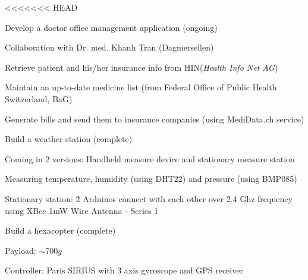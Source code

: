 

\begin{cventries}
<<<<<<< HEAD

\cventry
{} %
{Develop a doctor office management application (ongoing)} %
{} %
{} %
{\vspace{-12pt}
	\begin{cvitems} %
		\item {Collaboration with Dr. med. Khanh Tran (Dagmersellen)}
		\item {Retrieve patient and his/her insurance info from HIN(\textit{Health Info Net AG})}
		\item {Maintain an up-to-date medicine list (from Federal Office of Public Health Switzerland, BaG)}
		\item {Generate bills and send them to insurance companies (using MediData.ch service)}
	\end{cvitems}
}

\cventry
{} %
{Build a weather station (complete)} %
{} %
{} %
{\vspace{-12pt}
	\begin{cvitems} %
		\item {Coming in 2 versions: Handheld measure device and stationary measure station}
		\item {Measuring temperature, humidity (using DHT22) and pressure (using BMP085)}
		\item {Stationary station: 2 Arduinos connect with each other over 2.4 Ghz frequency using XBee 1mW Wire Antenna - Series 1}
	\end{cvitems}
}

  \cventry
    {} %
    {Build a hexacopter (complete)} %
    {} %
    {} %
    {\vspace{-12pt}
      \begin{cvitems} %
        \item {Payload: $ \sim 700g$}
        \item {Controller: Paris SIRIUS with 3 axis gyroscope and GPS receiver}
      \end{cvitems}
    }


\end{cventries}
